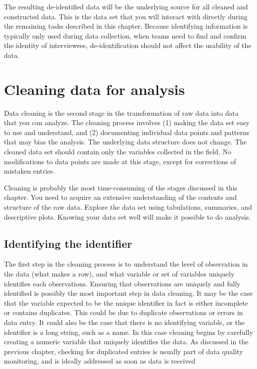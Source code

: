 The resulting de-identified data will be the underlying source for all cleaned and constructed data.
This is the data set that you will interact with directly during the remaining tasks described in this chapter.
Because identifying information is typically only used during data collection,
when teams need to find and confirm the identity of interviewees,
de-identification should not affect the usability of the data.

\section{Cleaning data for analysis}

Data cleaning is the second stage in the transformation of raw data into data that you can analyze.
The cleaning process involves (1) making the data set easy to use and understand,
and (2) documenting individual data points and patterns that may bias the analysis.
The underlying data structure does not change.
The cleaned data set should contain only the variables collected in the field.
No modifications to data points are made at this stage, except for corrections of mistaken entries.

Cleaning is probably the most time-consuming of the stages discussed in this chapter.
You need to acquire an extensive understanding of the contents and structure of the raw data.
Explore the data set using tabulations, summaries, and descriptive plots.
Knowing your data set well will make it possible to do analysis.

\subsection{Identifying the identifier}

The first step in the cleaning process is to understand the level of observation in the data (what makes a row), 
and what variable or set of variables uniquely identifies each observations.
Ensuring that observations are uniquely and fully identified
is possibly the most important step in data cleaning.
It may be the case that the variable expected to be the unique identifier in fact is either incomplete or contains duplicates. 
This could be due to duplicate observations or errors in data entry.
It could also be the case that there is no identifying variable, or the identifier is a long string, such as a name.
In this case cleaning begins by carefully creating a numeric variable that uniquely identifies the data. 
As discussed in the previous chapter,
checking for duplicated entries is usually part of data quality monitoring,
and is ideally addressed as soon as data is received


